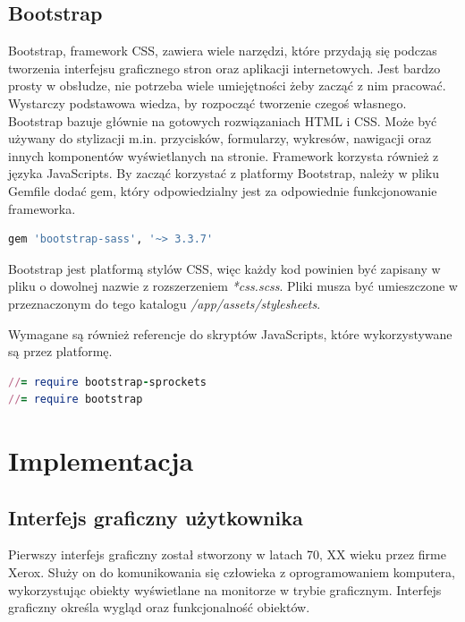 \documentclass[openright]{xmgr}
\begin{document}
	\section{Bootstrap}
	
	Bootstrap, framework CSS, zawiera wiele narzędzi, które przydają się podczas tworzenia interfejsu graficznego stron oraz aplikacji internetowych. Jest bardzo prosty w obsłudze, nie potrzeba wiele umiejętności żeby zacząć z nim pracować. Wystarczy podstawowa wiedza, by rozpocząć tworzenie czegoś własnego. Bootstrap bazuje głównie na gotowych rozwiązaniach HTML i CSS. Może być używany do stylizacji m.in. przycisków, formularzy, wykresów, nawigacji oraz innych komponentów wyświetlanych na stronie. Framework korzysta również z języka JavaScripts. By zacząć korzystać z platformy Bootstrap, należy w pliku Gemfile dodać gem, który odpowiedzialny jest za odpowiednie funkcjonowanie frameworka.
	
	\begin{lstlisting}[language=Ruby,lineskip={-1pt},caption=Plik \textit{Gemfile}]
gem 'bootstrap-sass', '~> 3.3.7'
	\end{lstlisting}

	Bootstrap jest platformą stylów CSS, więc każdy kod powinien być zapisany w pliku o dowolnej nazwie z rozszerzeniem \textit{*css.scss}. Pliki musza być umieszczone w przeznaczonym do tego katalogu \textit{/app/assets/stylesheets}.\\	
	
	\begin{flushleft}
		Wymagane są również referencje do skryptów JavaScripts, które wykorzystywane są przez platformę.
	\end{flushleft}
	
	\begin{lstlisting}[language=Ruby,lineskip={-1pt},caption=Referencje do skryptów JavaScripts]
//= require bootstrap-sprockets
//= require bootstrap
	\end{lstlisting}
	
	\chapter{Implementacja}
	
	\section {Interfejs graficzny użytkownika}
	
	Pierwszy interfejs graficzny został stworzony w latach 70, XX wieku przez firme Xerox. Służy on do komunikowania się człowieka z oprogramowaniem komputera, wykorzystując obiekty wyświetlane na monitorze w trybie graficznym. Interfejs graficzny określa wygląd oraz funkcjonalność obiektów. \\
\end{document}
